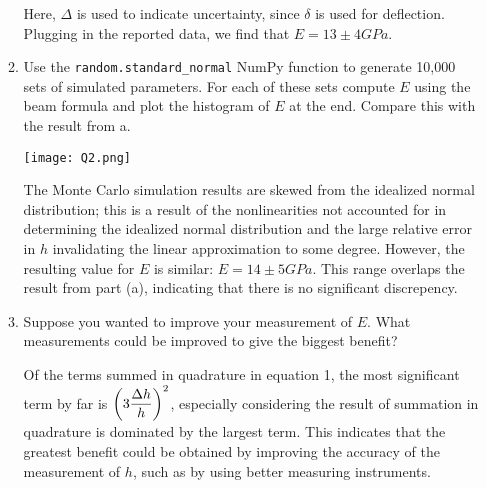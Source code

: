 \documentclass{article}
\begin{document}
\begin{enumerate}
\begin{enumerate}
Here, \(\Delta\) is used to indicate uncertainty, since \(\delta\) is used for deflection. Plugging in the reported data, we find that \(E = 13 \pm 4 \si{ GPa}\).

    \item Use the {\tt random.standard\_normal} NumPy function to generate 10,000 sets of simulated parameters. For each of these sets compute $E$ using the beam formula and plot the histogram of $E$ at the end. Compare this with the result from a.

\texttt{[image: Q2.png]}

The Monte Carlo simulation results are skewed from the idealized normal distribution; this is a result of the nonlinearities not accounted for in determining the idealized normal distribution and the large relative error in $h$ invalidating the linear approximation to some degree. However, the resulting value for $E$ is similar: $E = 14 \pm 5 \si{ GPa}$. This range overlaps the result from part (a), indicating that there is no significant discrepency.

    \item Suppose you wanted to improve your measurement of $E$. What measurements could be improved to give the biggest benefit?

Of the terms summed in quadrature in equation 1, the most significant term by far is \( \displaystyle \reluncer[3]{h} \), especially considering the result of summation in quadrature is dominated by the largest term. This indicates that the greatest benefit could be obtained by improving the accuracy of the measurement of \(h\), such as by using better measuring instruments.


\end{enumerate}



\end{enumerate}
\end{document}
